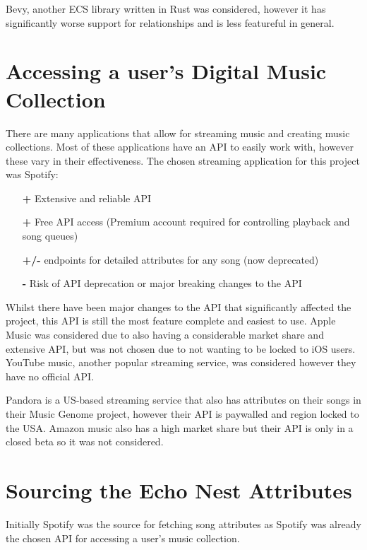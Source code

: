 Bevy, another ECS library written in Rust was considered, however it has significantly worse support for relationships and is less featureful in general.


\section{Accessing a user's Digital Music Collection}
There are many applications that allow for streaming music and creating music collections. Most of these applications have an API to easily work with, however these vary in their effectiveness. The chosen streaming application for this project was Spotify:\begin{itemize}
    \item[\textbf{+}] Extensive and reliable API
    \item[\textbf{+}] Free API access (Premium account required for controlling playback and song queues)
    \item[\textbf{+/-}] endpoints for detailed attributes for any song (now deprecated)
    \item[\textbf{-}] Risk of API deprecation or major breaking changes to the API
\end{itemize}

Whilst there have been major changes to the API that significantly affected the project, this API is still the most feature complete and easiest to use.
Apple Music was considered due to also having a considerable market share and extensive API, but was not chosen due to not wanting to be locked to iOS users. YouTube music, another popular streaming service, was considered however they have no official API.

Pandora is a US-based streaming service that also has attributes on their songs in their Music Genome project, however their API is paywalled and region locked to the USA. Amazon music also has a high market share but their API is only in a closed beta so it was not considered.

\section{Sourcing the Echo Nest Attributes}
Initially Spotify was the source for fetching song attributes as Spotify was already the chosen API for accessing a user's music collection.

